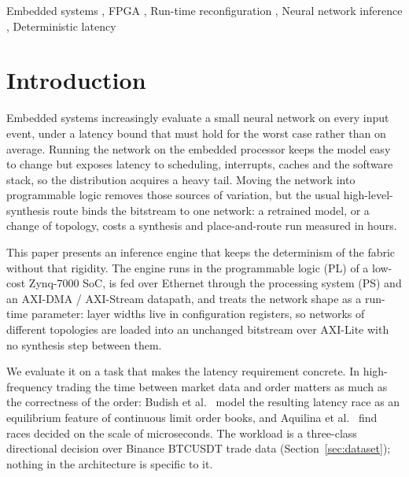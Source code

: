 \documentclass[final,5p,times,twocolumn]{elsarticle}
\begin{document}
\begin{frontmatter}
\begin{keyword}
Embedded systems \sep
FPGA \sep
Run-time reconfiguration \sep
Neural network inference \sep
Deterministic latency
\end{keyword}

\end{frontmatter}

\section{Introduction}
Embedded systems increasingly evaluate a small neural network on every input
event, under a latency bound that must hold for the worst case rather than on
average. Running the network on the embedded processor keeps the model easy to
change but exposes latency to scheduling, interrupts, caches and the software
stack, so the distribution acquires a heavy tail. Moving the network into
programmable logic removes those sources of variation, but the usual
high-level-synthesis route binds the bitstream to one network: a retrained
model, or a change of topology, costs a synthesis and place-and-route run
measured in hours.

This paper presents an inference engine that keeps the determinism of the
fabric without that rigidity. The engine runs in the programmable logic (PL) of
a low-cost Zynq-7000 SoC, is fed over Ethernet through the processing system
(PS) and an AXI-DMA / AXI-Stream datapath, and treats the network shape as a
run-time parameter: layer widths live in configuration registers, so networks of
different topologies are loaded into an unchanged bitstream over AXI-Lite with
no synthesis step between them.

We evaluate it on a task that makes the latency requirement concrete. In
high-frequency trading the time between market data and order matters as much
as the correctness of the order: Budish et al.~\cite{Budish2015} model the
resulting latency race as an equilibrium feature of continuous limit order
books, and Aquilina et al.~\cite{Aquilina2022} find races decided on the scale
of microseconds. The workload is a three-class directional decision over
Binance BTCUSDT trade data (Section~\ref{sec:dataset}); nothing in the
architecture is specific to it.
\end{document}
